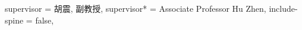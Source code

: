 {  %
  supervisor  = {胡震, 副教授},
  supervisor* = {Associate Professor Hu Zhen},
  include-spine = false,
}


\usepackage{amsthm}



\usepackage{threeparttable}

\usepackage{multirow}

\usepackage{tikz}
\usepackage{tikz-3dplot}
\usepackage[outline]{contour}
\contourlength{0.9pt}
\usetikzlibrary{3d,arrows.meta,bending}


\usepackage{longtable}

\usepackage{algorithm}
\usepackage{algorithmic}

\usepackage{siunitx}
\DeclareSIUnit{}

% 

% 

